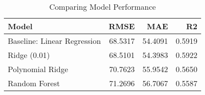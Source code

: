 \begin{table}
\centering
\caption{Comparing Model Performance}
\begin{tabular}{lrrr}
\toprule
                      Model &    RMSE &     MAE &     R2 \\
\midrule
Baseline: Linear Regression & 68.5317 & 54.4091 & 0.5919 \\
               Ridge (0.01) & 68.5101 & 54.3983 & 0.5922 \\
           Polynomial Ridge & 70.7623 & 55.9542 & 0.5650 \\
              Random Forest & 71.2696 & 56.7067 & 0.5587 \\
\bottomrule
\end{tabular}
\end{table}
